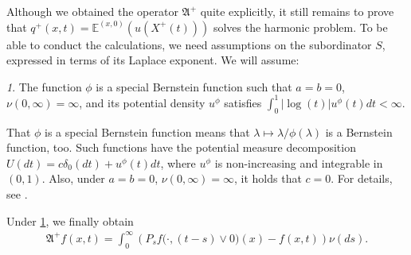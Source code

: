 \documentclass[reqno]{amsart}
\makeatletter
\theoremstyle{remark}
\numberwithin{equation}{section} %
\newcommand{\EE}{\mathds{E}}
\newcommand{\1}{\mathds{1}}
\newtheorem*{assumption*}{\assumptionnumber}
\providecommand{\assumptionnumber}{}
\newenvironment{assumption}[2]
{%
	\renewcommand{\assumptionnumber}{(\textbf{#1#2})}%
	\begin{assumption*}%
		\protected@edef\@currentlabel{(\textbf{#1#2})}%
	}
	{%
	\end{assumption*}
}
\makeatother
\begin{document}
	Although we obtained the operator $\mathfrak{A}^+$ quite explicitly, it still remains to prove that $q^+(x,t)=\EE^{(x,0)}(u(X^+(t)))$ solves the harmonic problem. To be able to conduct the calculations, we need assumptions on the subordinator $S$, expressed in terms of its Laplace exponent. We will assume:
	
	\begin{assumption}{S}{}\label{assphi}
		The function $\phi$ is a special Bernstein function such that $a=b=0$, $\nu(0,\infty)=\infty$, and its potential density $u^\phi$ satisfies $\int_0^1|\log(t)|u^\phi(t)dt<\infty$.
	\end{assumption}
	
	That $\phi$ is a special Bernstein function means that $\lambda\mapsto \lambda/\phi(\lambda)$ is a Bernstein function, too. Such functions have the potential measure decomposition $U(dt)=c \delta_0(dt)+u^\phi(t)dt$, where $u^\phi$ is non-increasing and integrable in $(0,1)$. Also, under $a=b=0$, $\nu(0,\infty)=\infty$, it holds that $c=0$. For details, see \cite[Chapter 13]{bernstein}.
	
	
	Under \ref{assphi}, we finally obtain
	\begin{align}\label{gen-over}
		\mathfrak{A}^+ f(x,t)=\int_0^\infty \left(P_sf\big(\cdot,(t-s)\vee0\big)(x)-f(x,t)\right)\nu(ds).
	\end{align}
	
\end{document}
